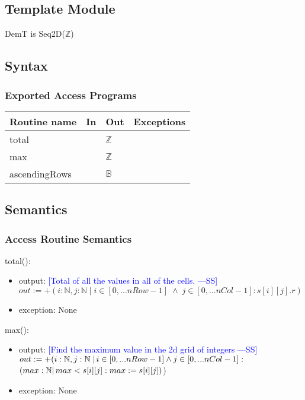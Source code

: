 \documentclass[12pt]{article}
\newcommand{\authornote}[3]{\textcolor{#1}{[#3 ---#2]}}
\newcommand{\authornote}[3]{}
\newcommand{\wss}[1]{\authornote{blue}{SS}{#1}}
\begin{document}
\subsection* {Template Module}

DemT is Seq2D($\mathbb{Z}$)

\subsection* {Syntax}

\subsubsection* {Exported Access Programs}

\begin{tabular}{| l | l | l | p{6cm} |}
\hline
\textbf{Routine name} & \textbf{In} & \textbf{Out} & \textbf{Exceptions}\\
\hline
total & & $\mathbb{Z}$ & \\
\hline
max &  & $\mathbb{Z}$ & \\
\hline
ascendingRows & & $\mathbb{B}$ & \\
\hline
\end{tabular}

\subsection* {Semantics}

\subsubsection* {Access Routine Semantics}

\noindent total():
\begin{itemize}
\item output: \wss{Total of all the values in all of the cells.}\\$out := +(i: \mathbb{N}, j : \mathbb{N} \; | \; i \in [0,...nRow-1] \; \land \; j \in [0,...nCol-1] : s[i][j].r)$
\item exception: None
\end{itemize}

\noindent max():
\begin{itemize}
\item output: \wss{Find the maximum value in the 2d grid of integers}\\$out := +(i: \mathbb{N}, j : \mathbb{N} \; | \thinspace i \in [0,...nRow-1] \land j \in [0,...nCol-1] :$ $(max: \mathbb{N} | \thinspace max < s[i][j] : max := s[i][j])$)
\item exception: None
\end{itemize}
\end{document}
